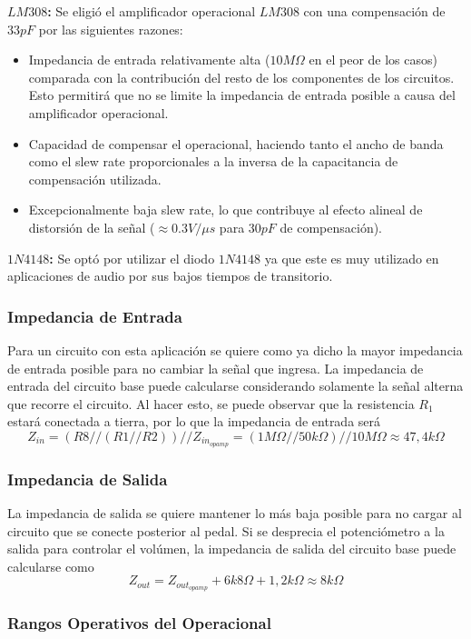 \textbf{$LM308$:} Se eligió el amplificador operacional $LM308$ con una compensación de $33pF$ por las siguientes razones:

\begin{itemize}
\item Impedancia de entrada relativamente alta ($10M\Omega$ en el peor de los casos) comparada con la contribución del resto de los componentes de los circuitos. Esto permitirá que no se limite la impedancia de entrada posible a causa del amplificador operacional.
\item Capacidad de compensar el operacional, haciendo tanto el ancho de banda como el slew rate proporcionales a la inversa de la capacitancia de compensación utilizada.
\item Excepcionalmente baja slew rate, lo que contribuye al efecto alineal de distorsión de la señal ($\approx 0.3V/\mu s$ para $30pF$ de compensación).
\end{itemize}

\textbf{$1N4148$:} Se optó por utilizar el diodo $1N4148$ ya que este es muy utilizado en aplicaciones de audio por sus bajos tiempos de transitorio.

\subsubsection{Impedancia de Entrada}

Para un circuito con esta aplicación se quiere como ya dicho la mayor impedancia de entrada posible para no cambiar la señal que ingresa.
La impedancia de entrada del circuito base puede calcularse considerando solamente la señal alterna que recorre el circuito. Al hacer esto, se puede observar que la resistencia $R_1$ estará conectada a tierra, por lo que la impedancia de entrada será
\[Z_{in} = (R8//(R1//R2))//Z_{in_{opamp}} = (1M\Omega // 50k\Omega)//10M\Omega \approx 47,4k\Omega\]

\subsubsection{Impedancia de Salida}

La impedancia de salida se quiere mantener lo más baja posible para no cargar al circuito que se conecte posterior al pedal.
Si se desprecia el potenciómetro a la salida para controlar el volúmen, la impedancia de salida del circuito base puede calcularse como
\[ Z_{out} = Z_{out_{opamp}} + 6k8\Omega + 1,2k\Omega \approx 8k\Omega \]

\subsubsection{Rangos Operativos del Operacional}

